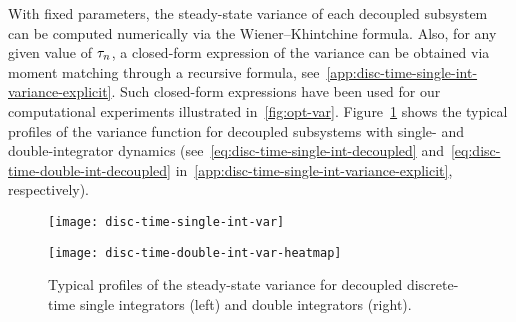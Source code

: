 
\label{sec:disc-time-single-int-moment-matching}
With fixed parameters,
the steady-state variance of each decoupled subsystem
can be computed numerically via the Wiener–Khintchine formula. %
Also, for any given value of $ \tau_n $,
a closed-form expression of the variance
can be obtained via moment matching through a recursive formula, see~\cref{app:disc-time-single-int-variance-explicit}.
Such closed-form expressions have been used for our computational experiments illustrated in~\autoref{fig:opt-var}.
\textcolor{subsectioncolor}{Figure~\ref{fig:disc-time-var}} shows the typical profiles
of the variance function for decoupled subsystems with single- and double-integrator dynamics
(see~\eqref{eq:disc-time-single-int-decoupled} and~\eqref{eq:disc-time-double-int-decoupled} in~\cref{app:disc-time-single-int-variance-explicit},
respectively).

\begin{figure}
	\centering
	\begin{minipage}{.5\linewidth}
		\centering
		\texttt{[image: disc-time-single-int-var]}
	\end{minipage}%
	\hfil
	\begin{minipage}{.5\linewidth}
		\centering
		\texttt{[image: disc-time-double-int-var-heatmap]}
	\end{minipage}
	\caption{Typical profiles of the steady-state variance
		for decoupled discrete-time single integrators (left) and double integrators (right). %
	}
	\label{fig:disc-time-var}
\end{figure}